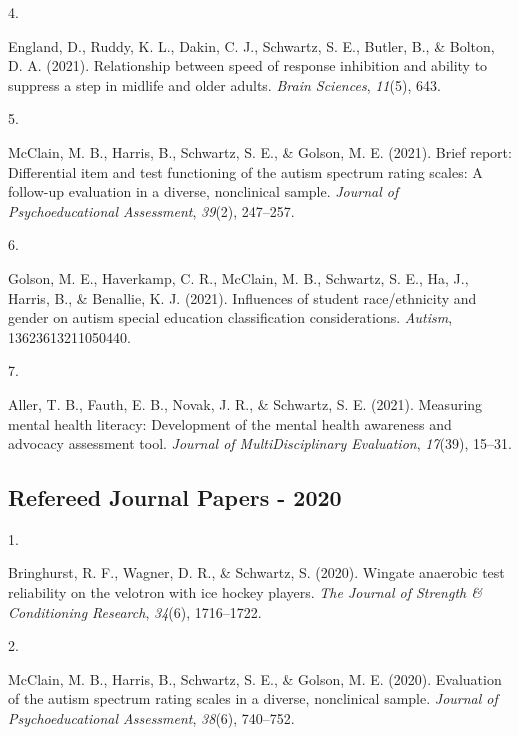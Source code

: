 \documentclass[11pt,a4paper,]{moderncv}
\newlength{\csllabelwidth}
\newcommand{\CSLLeftMargin}[1]{\parbox[t]{\csllabelwidth}{#1}}
\newcommand{\CSLRightInline}[1]{\parbox[t]{\linewidth - \csllabelwidth}{#1}}
\begin{document}
\leavevmode\hypertarget{ref-england2021relationship}{}%
\CSLLeftMargin{4. }
\CSLRightInline{England, D., Ruddy, K. L., Dakin, C. J., Schwartz, S.
E., Butler, B., \& Bolton, D. A. (2021). Relationship between speed of
response inhibition and ability to suppress a step in midlife and older
adults. \emph{Brain Sciences}, \emph{11}(5), 643.}

\leavevmode\hypertarget{ref-mcclain2021differential}{}%
\CSLLeftMargin{5. }
\CSLRightInline{McClain, M. B., Harris, B., Schwartz, S. E., \& Golson,
M. E. (2021). Brief report: Differential item and test functioning of
the autism spectrum rating scales: A follow-up evaluation in a diverse,
nonclinical sample. \emph{Journal of Psychoeducational Assessment},
\emph{39}(2), 247--257.}

\leavevmode\hypertarget{ref-golson2021influences}{}%
\CSLLeftMargin{6. }
\CSLRightInline{Golson, M. E., Haverkamp, C. R., McClain, M. B.,
Schwartz, S. E., Ha, J., Harris, B., \& Benallie, K. J. (2021).
Influences of student race/ethnicity and gender on autism special
education classification considerations. \emph{Autism},
13623613211050440.}

\leavevmode\hypertarget{ref-aller2021measuring}{}%
\CSLLeftMargin{7. }
\CSLRightInline{Aller, T. B., Fauth, E. B., Novak, J. R., \& Schwartz,
S. E. (2021). Measuring mental health literacy: Development of the
mental health awareness and advocacy assessment tool. \emph{Journal of
MultiDisciplinary Evaluation}, \emph{17}(39), 15--31.}

\vspace{7mm}

\hypertarget{refereed-journal-papers---2020}{%
\subsection{\texorpdfstring{\textbf{Refereed Journal Papers -
2020}}{Refereed Journal Papers - 2020}}\label{refereed-journal-papers---2020}}

\hypertarget{refs_journals2020}{}
\leavevmode\hypertarget{ref-bringhurst2020wingate}{}%
\CSLLeftMargin{1. }
\CSLRightInline{Bringhurst, R. F., Wagner, D. R., \& Schwartz, S.
(2020). Wingate anaerobic test reliability on the velotron with ice
hockey players. \emph{The Journal of Strength \& Conditioning Research},
\emph{34}(6), 1716--1722.}

\leavevmode\hypertarget{ref-mcclain2020evaluation}{}%
\CSLLeftMargin{2. }
\CSLRightInline{McClain, M. B., Harris, B., Schwartz, S. E., \& Golson,
M. E. (2020). Evaluation of the autism spectrum rating scales in a
diverse, nonclinical sample. \emph{Journal of Psychoeducational
Assessment}, \emph{38}(6), 740--752.}
\end{document}
